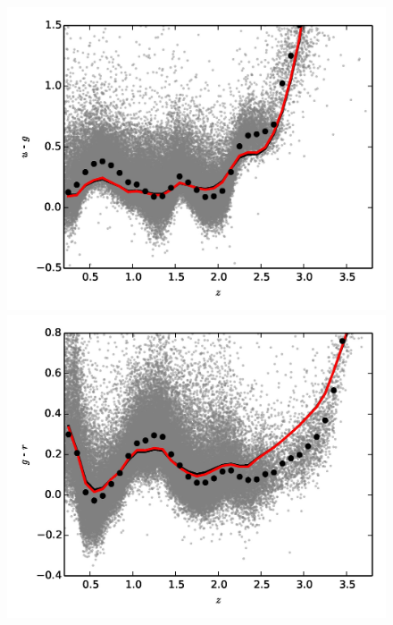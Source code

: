 \begin{figure}
  \centering
  \begin{minipage}[b]{0.49\textwidth}
    \includegraphics[width=\textwidth]{figures/chapter06/ug.jpg}
  \end{minipage}
  \begin{minipage}[b]{0.49\textwidth}
    \includegraphics[width=\textwidth]{figures/chapter06/gr.jpg}
  \end{minipage} \\
\begin{minipage}[b]{0.49\textwidth}

\end{minipage}
\end{figure}
